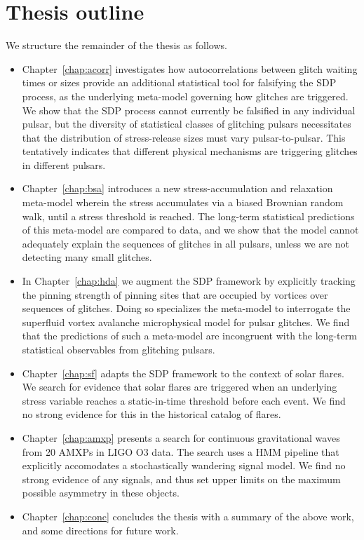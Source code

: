 \section{Thesis outline} \label{sec:intro_outline}
We structure the remainder of the thesis as follows.
\begin{itemize}
    \item Chapter~\ref{chap:acorr} investigates how autocorrelations between glitch waiting times or sizes provide an additional statistical tool for falsifying the SDP process, as the underlying meta-model governing how glitches are triggered. We show that the SDP process cannot currently be falsified in any individual pulsar, but the diversity of statistical classes of glitching pulsars necessitates that the distribution of stress-release sizes must vary pulsar-to-pulsar. This tentatively indicates that different physical mechanisms are triggering glitches in different pulsars.
    \item Chapter~\ref{chap:bsa} introduces a new stress-accumulation and relaxation meta-model wherein the stress accumulates via a biased Brownian random walk, until a stress threshold is reached. The long-term statistical predictions of this meta-model are compared to data, and we show that the model cannot adequately explain the sequences of glitches in all pulsars, unless we are not detecting many small glitches.
    \item In Chapter~\ref{chap:hda} we augment the SDP framework by explicitly tracking the pinning strength of pinning sites that are occupied by vortices over sequences of glitches. Doing so specializes the meta-model to interrogate the superfluid vortex avalanche microphysical model for pulsar glitches. We find that the predictions of such a meta-model are incongruent with the long-term statistical observables from glitching pulsars. 
    \item Chapter~\ref{chap:sf} adapts the SDP framework to the context of solar flares. We search for evidence that solar flares are triggered when an underlying stress variable reaches a static-in-time threshold before each event. We find no strong evidence for this in the historical catalog of flares.
    \item Chapter~\ref{chap:amxp} presents a search for continuous gravitational waves from 20 AMXPs in LIGO O3 data. The search uses a HMM pipeline that explicitly accomodates a stochastically wandering signal model. We find no strong evidence of any signals, and thus set upper limits on the maximum possible asymmetry in these objects.
    \item Chapter~\ref{chap:conc} concludes the thesis with a summary of the above work, and some directions for future work.
\end{itemize}